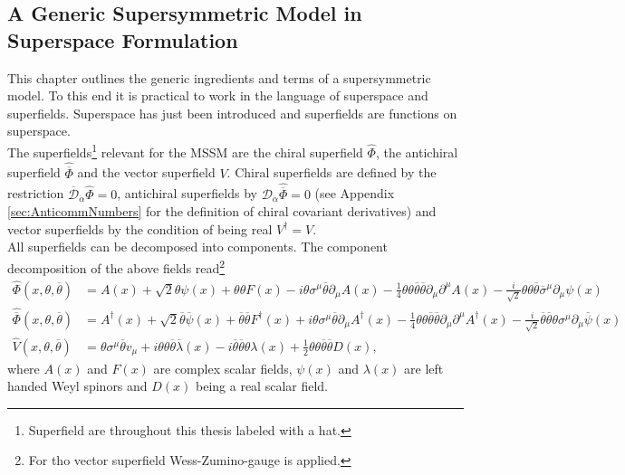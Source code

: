 \subsection{A Generic Supersymmetric Model in Superspace Formulation}
This chapter outlines the generic ingredients and terms of a supersymmetric model. To this end it is practical to work in the language of superspace and superfields. Superspace has just been introduced and superfields are functions on superspace.\\
The superfields\footnote{Superfield are throughout this thesis labeled with a hat.} relevant for the MSSM are the chiral superfield $\hat{\Phi}$, the antichiral superfield $\hat{\overline{\Phi}}$ and the vector superfield $V$. Chiral superfields are defined by the restriction $\overline{\mathcal{D}}_{\dot{\alpha}}\hat{\Phi} = 0$, antichiral superfields by $\mathcal{D}_\alpha\hat{\overline{\Phi}} = 0$ (see Appendix \ref{sec:AnticommNumbers} for the definition of chiral covariant derivatives) and vector superfields by the condition of being real $V^\dagger = V$.\\
All superfields can be decomposed into components. The component decomposition of the above fields read\footnote{For tho vector superfield Wess-Zumino-gauge is applied.}
\begin{align}
\hat{\Phi}(x,\theta,\overline{\theta}) &= A(x) + \sqrt{2}\theta\psi(x) + \theta\theta F(x) - i\theta\sigma^\mu \overline{\theta}\partial_\mu A(x) - \frac{1}{4}\theta\theta\overline{\theta}\overline{\theta}\partial_\mu\partial^\mu A(x) - \frac{i}{\sqrt{2}}\theta\theta\overline{\theta}\overline{\sigma}^\mu \partial_\mu\psi(x)\nonumber\\
\hat{\overline{\Phi}}(x,\theta,\overline{\theta}) &= A^\dagger(x) + \sqrt{2}\overline{\theta}\overline{\psi}(x) + \overline{\theta}\overline{\theta} F^\dagger(x) + i\theta\sigma^\mu \overline{\theta}\partial_\mu A^\dagger(x) - \frac{1}{4}\theta\theta\overline{\theta}\overline{\theta}\partial_\mu\partial^\mu A^\dagger(x) - \frac{i}{\sqrt{2}}\overline{\theta}\overline{\theta}\theta\sigma^\mu \partial_\mu\overline{\psi}(x)\nonumber\\
\hat{V}(x,\theta,\overline{\theta}) &= \theta\sigma^\mu\overline{\theta} v_\mu + i\theta\theta\overline{\theta}\overline{\lambda}(x) -i \overline{\theta}\overline{\theta}\theta\lambda(x) + \frac{1}{2}\theta\theta\overline{\theta}\overline{\theta}D(x),\label{eq:superfielddecomp}
\end{align}
where $A(x)$ and $F(x)$ are complex scalar fields, $\psi(x)$ and $\lambda(x)$ are left handed Weyl spinors and $D(x)$ being a real scalar field.\\
